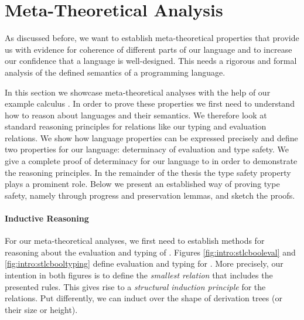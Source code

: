 {%
\section{Meta-Theoretical Analysis}\label{sec:intro:typesafety}


As discussed before, we want to establish meta-theoretical properties that
provide us with evidence for coherence of different parts of our language and to
increase our confidence that a language is well-designed. This needs a rigorous
and formal analysis of the defined semantics of a programming language.

In this section we showcase meta-theoretical analyses with the help of our
example calculus \stlcbool. In order to prove these properties we first need to
understand how to reason about languages and their semantics. We therefore look
at standard reasoning principles for relations like our typing and evaluation
relations. We show how language properties can be expressed precisely and define
two properties for our language: determinacy of evaluation and type safety. We
give a complete proof of determinacy for our language to in order to demonstrate
the reasoning principles. In the remainder of the thesis the type safety
property plays a prominent role. Below we present an established way of proving
type safety, namely through progress and preservation lemmas, and sketch the
proofs.


\paragraph{Inductive Reasoning}
For our meta-theoretical analyses, we first need to establish methods for
reasoning about the evaluation and typing of \stlcbool. Figures
\ref{fig:intro:stlcbooleval} and \ref{fig:intro:stlcbooltyping} define
evaluation and typing for \stlcbool. More precisely, our intention in both
figures is to define the \emph{smallest relation} that includes the presented
rules. This gives rise to a \emph{structural induction principle} for the
relations. Put differently, we can induct over the shape of derivation trees (or
their size or height).

}
